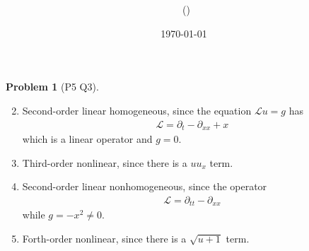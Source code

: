 \documentclass[twoside,11pt]{article}
\title{{\sffamily \Code \ \Ass}}
\author{\sffamily \name \ (\href{mailto:\mail}{\mail})}
\date{\sffamily \today}
\makeatletter
\renewcommand{\L}{\mathcal{L}}
\theoremstyle{definition}
\newtheorem{problem}{Problem}
\theoremstyle{remark}
\newtheorem*{remark}{Remark}
\renewcommand{\maketitle}{\bgroup\setlength{\parindent}{0pt}
\begin{flushleft}
  \textbf{\Large\@title}

  \@author
\end{flushleft}\egroup
}
\makeatother
\begin{document}
\maketitle
\thispagestyle{title}


\begin{problem}[P5 Q3]\
\begin{enumerate}[label=(\alph*)]
    \setcounter{enumi}{1}
    \item Second-order linear homogeneous, since the equation $\mathcal{L}u = g$ has
    \begin{align*}
        \mathcal{L} = \partial_t - \partial_{xx} + x
    \end{align*}
    which is a linear operator and $g=0$.
    
    \item Third-order nonlinear, since there is a $uu_x$ term.
    
    \item Second-order linear nonhomogeneous, since the operator
    \begin{align*}
        \L = \partial_{tt} - \partial_{xx}
    \end{align*}
    while $g=-x^2\neq 0$.
    
    \setcounter{enumi}{7}
    \item Forth-order nonlinear, since there is a $\sqrt{u+1}$ term.
\end{enumerate}
\end{problem}
\end{document}
